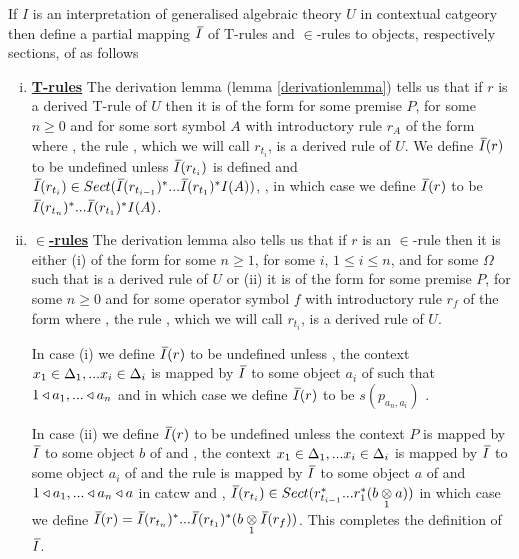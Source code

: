 
\newcommand{\Ibar}{\mkern 2.5mu\overline{\mkern-2.5mu I\mkern1.5mu}\mkern -1.5mu}

\begin{definition}
If $I$ is an interpretation of generalised algebraic theory $U$ in contextual catgeory \catcw
then define a
partial mapping $\Ibar$  of T-rules and $\in$-rules to objects, respectively sections, of \catcw
as follows
\begin{enumerate}[(i)] 
\item \underline{\textbf{T-rules}} 
The derivation lemma (lemma \ref{derivationlemma}) tells us that if $r$ is a derived T-rule of $U$  then it is of the form  for some premise $P$, for some $n \geq 0$ and for some sort symbol $A$ with introductory rule $r_A$ of the form  where \foreachi, the rule 
, which we will call $r_{t_i}$, is a derived rule of $U$. 
We define $\Ibar(r)$ to be undefined unless
$\Ibar(r_{t_i})$ is defined and $\Ibar(r_{t_i}) \in Sect(\Ibar(r_{t_{i-1}})^*...\Ibar(r_{t_1})^*I(A))$, \foreachi,
in which case we define $\Ibar(r)$ to be $\Ibar(r_{t_n})^*...\Ibar(r_{t_1})^*I(A)$. 
\item \underline{\textbf{$\boldsymbol {\in}$-rules}} 
The derivation lemma also tells us that if $r$ is an $\in$-rule then it is  
either (i) of the form  for some $n \ge 1$, for some $i$, $1 \leq i \leq n$, 
and for some $\Omega$ such that  is a derived rule of $U$
or (ii) it is of the form  for some premise $P$, for some $n \geq 0$ and for some operator symbol $f$ with introductory rule $r_f$ of the form  where \foreachi, the rule 
, which we will call $r_{t_i}$, is a derived rule of $U$. 

In  case (i) we define $\Ibar(r)$ to be undefined unless \foreachi, the context $x_1 \in \Delta_1,... x_{i} \in \Delta_{i}$ is mapped by $\Ibar$ to some object $a_i$ of \catcw such
that $1 \triangleleft a_1,...\triangleleft a_n$ and in which case we define $\Ibar(r)$ to be
$s(p_{a_n,a_i})$ . 

In  case (ii) 
we define $\Ibar(r)$ to be undefined unless
the context  $P$ is mapped by $\Ibar$ to some object $b$ of \catcw 
and \foreachi, the context $x_1 \in \Delta_1,... x_{i} \in \Delta_{i}$ is mapped by $\Ibar$ to some object $a_i$ of \catcw
and the rule  is mapped by $\Ibar$ to some object $a$ of \catcw and
$1 \triangleleft a_1,...\triangleleft a_n \triangleleft a$ in catcw 
and \foreachi, $\Ibar(r_{t_i}) \in Sect(r_{t_{i-1}}^*...r_1^* (\crossx{b}{a}{1}))$
in which case we
define $\Ibar(r)=\Ibar(r_{t_n})^*...\Ibar(r_{t_1})^*(\crossx{b}{\Ibar(r_f)}{1})$.
This completes the definition of $\Ibar$.
\end{enumerate}
\end{definition}

